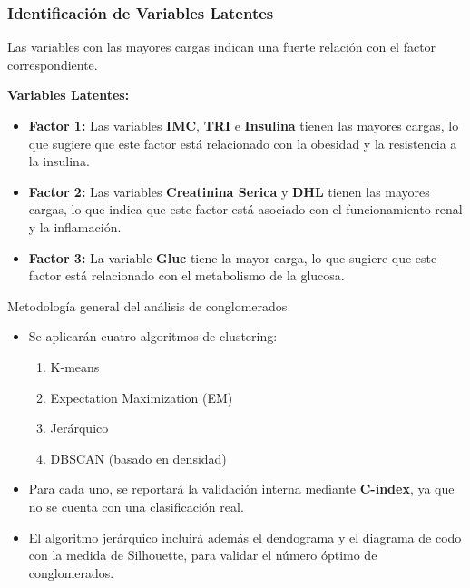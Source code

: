 \documentclass[
	11pt, %
]{beamer}
\begin{document}
\begin{frame}
\frametitle{Identificación de Variables Latentes}

Las variables con las mayores cargas indican una fuerte relación con el factor correspondiente.

\vspace{0.4cm}

\textbf{Variables Latentes:}

\begin{itemize}
    \item \textbf{Factor 1:} Las variables \textbf{IMC}, \textbf{TRI} e \textbf{Insulina} tienen las mayores cargas, lo que sugiere que este factor está relacionado con la obesidad y la resistencia a la insulina.
    \item \textbf{Factor 2:} Las variables \textbf{Creatinina Serica} y \textbf{DHL} tienen las mayores cargas, lo que indica que este factor está asociado con el funcionamiento renal y la inflamación.
    \item \textbf{Factor 3:} La variable \textbf{Gluc} tiene la mayor carga, lo que sugiere que este factor está relacionado con el metabolismo de la glucosa.
\end{itemize}

\end{frame}


\begin{frame}{Metodología general del análisis de conglomerados}
    \begin{itemize}
        \item Se aplicarán cuatro algoritmos de clustering:
        \begin{enumerate}
            \item K-means
            \item Expectation Maximization (EM)
            \item Jerárquico
            \item DBSCAN (basado en densidad)
        \end{enumerate}
        \item Para cada uno, se reportará la validación interna mediante \textbf{C-index}, ya que no se cuenta con una clasificación real.
        \item El algoritmo jerárquico incluirá además el dendograma y el diagrama de codo con la medida de Silhouette, para validar el número óptimo de conglomerados.
    \end{itemize}
\end{frame}
\end{document}

